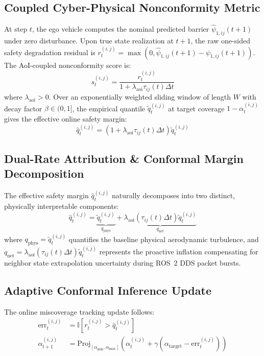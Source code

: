 \documentclass[lettersize,journal]{IEEEtran}
\begin{document}
\subsection{Coupled Cyber-Physical Nonconformity Metric}
At step $t$, the ego vehicle computes the nominal predicted barrier $\hat{\psi}_{1,ij}(t+1)$ under zero disturbance. Upon true state realization at $t+1$, the raw one-sided safety degradation residual is $r_t^{(i,j)} = \max(0, \hat{\psi}_{1,ij}(t+1) - \psi_{1,ij}(t+1))$. The AoI-coupled nonconformity score is:
\begin{equation}
s_t^{(i,j)} = \frac{r_t^{(i,j)}}{1 + \lambda_{\mathrm{aoi}} \tau_{ij}(t) \Delta t}
\end{equation}
where $\lambda_{\mathrm{aoi}} > 0$. Over an exponentially weighted sliding window of length $W$ with decay factor $\beta \in (0, 1]$, the empirical quantile $\tilde{q}_t^{(i,j)}$ at target coverage $1 - \alpha_t^{(i,j)}$ gives the effective online safety margin:
\begin{equation}
\hat{q}_t^{(i,j)} = (1 + \lambda_{\mathrm{aoi}} \tau_{ij}(t) \Delta t) \tilde{q}_t^{(i,j)}
\end{equation}

\subsection{Dual-Rate Attribution \& Conformal Margin Decomposition}
The effective safety margin $\hat{q}_t^{(i,j)}$ naturally decomposes into two distinct, physically interpretable components:
\begin{equation}
\hat{q}_t^{(i,j)} = \underbrace{\tilde{q}_t^{(i,j)}}_{q_{\mathrm{phys}}} + \underbrace{\lambda_{\mathrm{aoi}} (\tau_{ij}(t) \Delta t) \tilde{q}_t^{(i,j)}}_{q_{\mathrm{net}}}
\end{equation}
where $q_{\mathrm{phys}} = \tilde{q}_t^{(i,j)}$ quantifies the baseline physical aerodynamic turbulence, and $q_{\mathrm{net}} = \lambda_{\mathrm{aoi}} (\tau_{ij}(t) \Delta t) \tilde{q}_t^{(i,j)}$ represents the proactive inflation compensating for neighbor state extrapolation uncertainty during ROS~2 DDS packet bursts.

\subsection{Adaptive Conformal Inference Update}
The online miscoverage tracking update follows:
\begin{align}
\mathrm{err}_t^{(i,j)} &= \mathbb{I}\left[ r_t^{(i,j)} > \hat{q}_t^{(i,j)} \right] \nonumber \\
\alpha_{t+1}^{(i,j)} &= \mathrm{Proj}_{[\alpha_{\min}, \alpha_{\max}]} \left( \alpha_t^{(i,j)} + \gamma (\alpha_{\mathrm{target}} - \mathrm{err}_t^{(i,j)}) \right)
\end{align}
\end{document}
